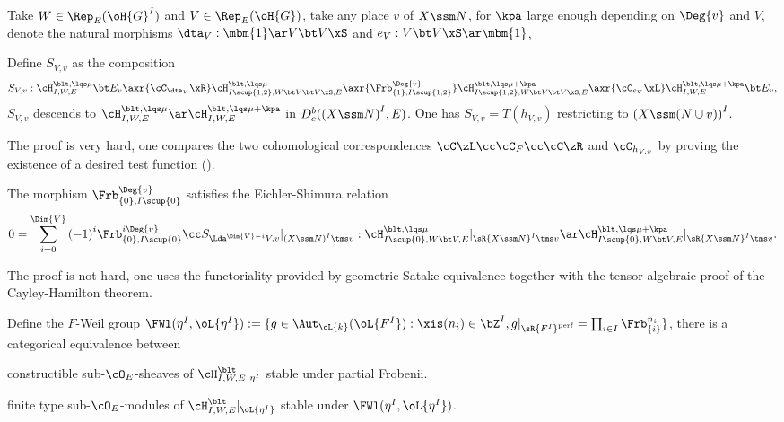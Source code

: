 \documentclass[article, a4paper, twoside]{universal}
\begin{document}
\begin{stp}
	Take $W\in\Rep_{E}(\oH{G}^{I})$ and $V\in\Rep_{E}(\oH{G})$, take any place $v$ of $X\ssm N$, for $\kpa$ large enough depending on $\Deg{v}$ and $V$, denote the natural morphisms $\dta_{V}:\mbm{1}\ar V\bt V\xS$ and $e_{V}:V\bt V\xS\ar \mbm{1}$,
\end{stp}

\begin{thm}[$S=T$, {\cite[Proposition~6.2]{Lafforgue2018Chtoucas}}]
	Define $S_{V,v}$ as the composition
	\[
		S_{V,v}:\cH_{I,W,E}^{\blt,\lqs\mu}\bt E_{v}\axr{\cC_{\dta_{V}}\xR}\cH_{I\scup\{1,2\},W\bt V\bt V\xS,E}^{\blt,\lqs\mu}\axr{\Frb_{\{1\},I\scup\{1,2\}}^{\Deg{v}}}\cH_{I\scup\{1,2\},W\bt V\bt V\xS,E}^{\blt,\lqs\mu+\kpa}\axr{\cC_{e_{V}}\xL}\cH_{I,W,E}^{\blt,\lqs\mu+\kpa}\bt E_{v},
	\]
	$S_{V,v}$ descends to $\cH_{I,W,E}^{\blt,\lqs\mu}\ar\cH_{I,W,E}^{\blt,\lqs\mu+\kpa}$ in $D_{c}^{b}({(X\ssm N)}^{I},E)$. One has $S_{V,v}=T(h_{V,v})$ restricting to ${(X\ssm(N\cup v))}^{I}$.
\end{thm}

\begin{rmk}
	The proof is very hard, one compares the two cohomological correspondences $\cC\zL\cc\cC_{F}\cc\cC\zR$ and $\cC_{h_{V,v}}$ by proving the existence of a desired test function (\cite[Lemma~6.12, Lemma~6.13]{Lafforgue2018Chtoucas}).
\end{rmk}

\begin{thm}
	The morphism $\Frb_{\{0\},I\scup\{0\}}^{\Deg{v}}$ satisfies the Eichler-Shimura relation
	\[
		0=\sum_{i=0}^{\Dim{V}}{(-1)}^{i}\Frb_{\{0\},I\scup\{0\}}^{i\Deg{v}}\cc S_{\Lda^{\Dim{V}-i}V,v}|_{{(X\ssm N)}^{I}\tms v}:\cH_{I\scup\{0\},W\bt V,E}^{\blt,\lqs\mu}|_{\sR{X\ssm N}^{I}\tms v}\ar\cH_{I\scup\{0\},W\bt V,E}^{\blt,\lqs\mu+\kpa}|_{\sR{X\ssm N}^{I}\tms v}.
	\]
\end{thm}

\begin{rmk}
	The proof is not hard, one uses the functoriality provided by geometric Satake equivalence together with the tensor-algebraic proof of the Cayley-Hamilton theorem.
\end{rmk}


\begin{stp}
	Define the $F$-Weil group $\FWl(\eta^{I},\oL{\eta^{I}}):=\{g\in\Aut_{\oL{k}}(\oL{F^{I}}):\xis(n_{i})\in\bZ^{I}, g|_{\sR{F^{I}}^{\text{perf}}}=\prod_{i\in I}\Frb_{\{i\}}^{n_{i}}\}$, there is a categorical equivalence between
	\begin{itm}
		\item constructible sub-$\cO_{E}$-sheaves of $\cH_{I,W,E}^{\blt}|_{\eta^{I}}$ stable under partial Frobenii.
		\item finite type sub-$\cO_{E}$-modules of $\cH_{I,W,E}^{\blt}|_{\oL{\eta^{I}}}$ stable under $\FWl(\eta^{I},\oL{\eta^{I}})$.
	\end{itm}
\end{stp}
\end{document}
